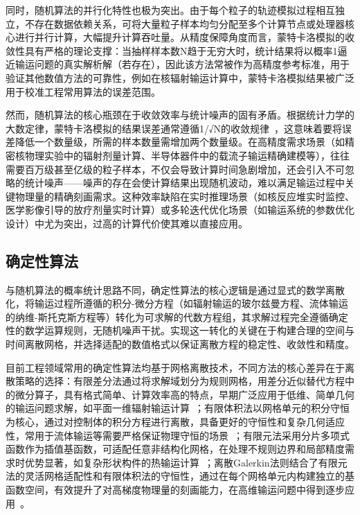 同时，随机算法的并行化特性也极为突出。由于每个粒子的轨迹模拟过程相互独立，不存在数据依赖关系，可将大量粒子样本均匀分配至多个计算节点或处理器核心进行并行计算，大幅提升计算吞吐量。从精度保障角度而言，蒙特卡洛模拟的收敛性具有严格的理论支撑：当抽样样本数N趋于无穷大时，统计结果将以概率1逼近输运问题的真实解析解（若存在），因此该方法常被作为高精度参考标准，用于验证其他数值方法的可靠性，例如在核辐射输运计算中，蒙特卡洛模拟结果被广泛用于校准工程常用算法的误差范围。

然而，随机算法的核心瓶颈在于收敛效率与统计噪声的固有矛盾。根据统计力学的大数定律，蒙特卡洛模拟的结果误差通常遵循1/√N的收敛规律~\cite{spanier2008monte}，这意味着要将误差降低一个数量级，所需的样本数量需增加两个数量级。在高精度需求场景（如精密核物理实验中的辐射剂量计算、半导体器件中的载流子输运精确建模等），往往需要百万级甚至亿级的粒子样本，不仅会导致计算时间急剧增加，还会引入不可忽略的统计噪声——噪声的存在会使计算结果出现随机波动，难以满足输运过程中关键物理量的精确刻画需求。这种效率缺陷在实时推理场景（如核反应堆实时监控、医学影像引导的放疗剂量实时计算）或多轮迭代优化场景（如输运系统的参数优化设计）中尤为突出，过高的计算代价使其难以直接应用。

\subsection{确定性算法}

与随机算法的概率统计思路不同，确定性算法的核心逻辑是通过显式的数学离散化，将输运过程所遵循的积分-微分方程（如辐射输运的玻尔兹曼方程、流体输运的纳维-斯托克斯方程等）转化为可求解的代数方程组，其求解过程完全遵循确定性的数学运算规则，无随机噪声干扰。实现这一转化的关键在于构建合理的空间与时间离散网格，并选择适配的数值格式以保证离散方程的稳定性、收敛性和精度。

目前工程领域常用的确定性算法均基于网格离散技术，不同方法的核心差异在于离散策略的选择：有限差分法通过将求解域划分为规则网格，用差分近似替代方程中的微分算子，具有格式简单、计算效率高的特点，早期广泛应用于低维、简单几何的输运问题求解，如平面一维辐射输运计算~\cite{lathrop1969spatial,klose2002optical,han2014two}；有限体积法以网格单元的积分守恒为核心，通过对控制体的积分方程进行离散，具备更好的守恒性和复杂几何适应性，常用于流体输运等需要严格保证物理守恒的场景~\cite{ren2004algorithm}；有限元法采用分片多项式函数作为插值基函数，可适配任意非结构化网格，在处理不规则边界和局部精度需求时优势显著，如复杂形状构件的热输运计算~\cite{martin1981phase,tarvainen2005coupled}；离散Galerkin法则结合了有限元法的灵活网格适配性和有限体积法的守恒性，通过在每个网格单元内构建独立的基函数空间，有效提升了对高梯度物理量的刻画能力，在高维输运问题中得到逐步应用~\cite{cockburn2003discontinuous,wareing2001discontinuous,morel2005sn}。

